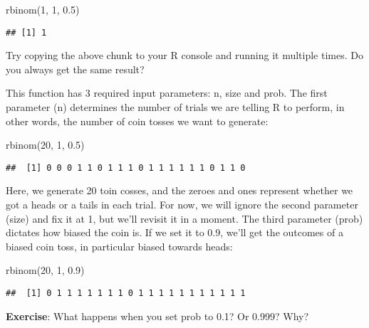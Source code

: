 \documentclass[
]{book}
\newenvironment{Shaded}{\begin{snugshade}}{\end{snugshade}}
\newcommand{\DecValTok}[1]{\textcolor[rgb]{0.00,0.00,0.81}{#1}}
\newcommand{\FloatTok}[1]{\textcolor[rgb]{0.00,0.00,0.81}{#1}}
\newcommand{\FunctionTok}[1]{\textcolor[rgb]{0.00,0.00,0.00}{#1}}
\newcommand{\NormalTok}[1]{#1}
\begin{document}
\begin{Shaded}
\begin{Highlighting}[]
\FunctionTok{rbinom}\NormalTok{(}\DecValTok{1}\NormalTok{, }\DecValTok{1}\NormalTok{, }\FloatTok{0.5}\NormalTok{)}
\end{Highlighting}
\end{Shaded}

\begin{verbatim}
## [1] 1
\end{verbatim}

Try copying the above chunk to your R console and running it multiple times. Do you always get the same result?

This function has 3 required input parameters: n, size and prob. The first parameter (n) determines the number of trials we are telling R to perform, in other words, the number of coin tosses we want to generate:

\begin{Shaded}
\begin{Highlighting}[]
\FunctionTok{rbinom}\NormalTok{(}\DecValTok{20}\NormalTok{, }\DecValTok{1}\NormalTok{, }\FloatTok{0.5}\NormalTok{)}
\end{Highlighting}
\end{Shaded}

\begin{verbatim}
##  [1] 0 0 0 1 1 0 1 1 1 0 1 1 1 1 1 1 0 1 1 0
\end{verbatim}

Here, we generate 20 toin cosses, and the zeroes and ones represent whether we got a heads or a tails in each trial. For now, we will ignore the second parameter (size) and fix it at 1, but we'll revisit it in a moment. The third parameter (prob) dictates how biased the coin is. If we set it to 0.9, we'll get the outcomes of a biased coin toss, in particular biased towards heads:

\begin{Shaded}
\begin{Highlighting}[]
\FunctionTok{rbinom}\NormalTok{(}\DecValTok{20}\NormalTok{, }\DecValTok{1}\NormalTok{, }\FloatTok{0.9}\NormalTok{)}
\end{Highlighting}
\end{Shaded}

\begin{verbatim}
##  [1] 0 1 1 1 1 1 1 1 0 1 1 1 1 1 1 1 1 1 1 1
\end{verbatim}

\textbf{Exercise}: What happens when you set prob to 0.1? Or 0.999? Why?
\end{document}
